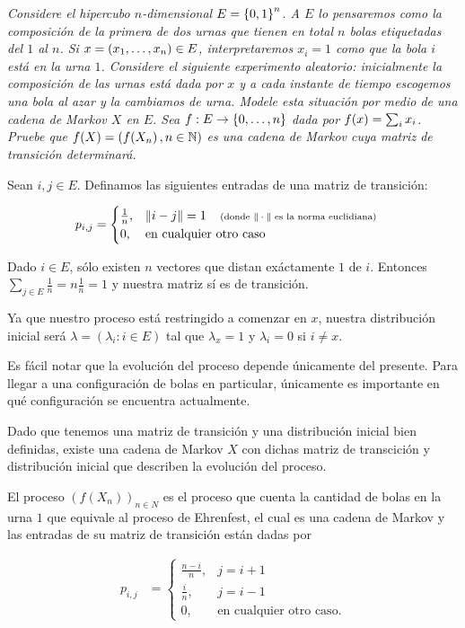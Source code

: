 \emph{
	Considere el hipercubo $n$-dimensional $E=\left\{ 0,1\right\} ^n$. A $E$ lo pensaremos como la composici\'on 
	de la primera de dos urnas que tienen en total $n$ bolas etiquetadas del $1$ al $n$. 
	Si $x=\left( x_1,\ldots, x_n\right) \in E$, interpretaremos $x_i=1$ como que la bola $i$ est\'a en la urna $1$. 
	Considere el siguiente experimento aleatorio: inicialmente la composici\'on de las urnas est\'a dada por 
	$x$ y a cada instante de tiempo escogemos una bola al azar y la cambiamos de urna. 
	Modele esta situaci\'on por medio de una cadena de Markov $X$ en $E$. Sea $f:E\to \left\{ 0,\ldots, n\right\} $ 
	dada por $f\!\left( x\right) =\sum_i x_i$. Pruebe que $f\!\left( X\right) =\left( f\!\left( X_n\right) ,n\in\mathbb{N}\right) $ es una cadena de 
	Markov cuya matriz de transici\'on determinar\'a.
}
\afterstatement\pn

Sean $i,j \in E$. Definamos las siguientes entradas de una matriz de transición:

\begin{align}
        p_{i,j} &=   
                    \begin{cases}
                        \frac{1}{n},    &       \|i-j\| = 1 \;\;\;\;\mbox{{\scriptsize(donde $\|\cdot\|$ es la norma euclidiana)}}  \\
                        0,              &       \text{en cualquier otro caso}
                    \end{cases}
\end{align}

Dado $i \in E$, sólo existen $n$ vectores que distan exáctamente $1$ de $i$. Entonces 
$\sum_{j \in E} \frac{1}{n} = n \frac{1}{n} = 1$ y nuestra matriz sí es de transición.\pn

Ya que nuestro proceso está restringido a comenzar en $x$, nuestra distribución inicial
será $\lambda = (\lambda_i : i \in E)$ tal que $\lambda_x = 1$ y $\lambda_i = 0$ si $i \not= x$.\pn

Es fácil notar que la evolución del proceso depende únicamente del presente. Para llegar a una configuración
de bolas en particular, únicamente es importante en qué configuración se encuentra actualmente.\pn

Dado que tenemos una matriz de transición y una distribución inicial bien definidas, existe una cadena de
Markov $X$ con dichas matriz de transcición y distribución inicial que describen la evolución del proceso.\pn

El proceso $(f(X_n))_{n \in N}$ es el proceso que cuenta la cantidad de bolas en la urna $1$ que equivale al proceso
de Ehrenfest, el cual es una cadena de Markov y las entradas de su matriz de transición están dadas por

\begin{align}
        p_{i,j}     &=  
                        \begin{cases}
                            \frac{n-i}{n},  &   j=i+1   \\
                            \frac{i}{n},    &   j=i-1   \\
                            0,              &   \text{en cualquier otro caso.}
                        \end{cases}
\end{align}